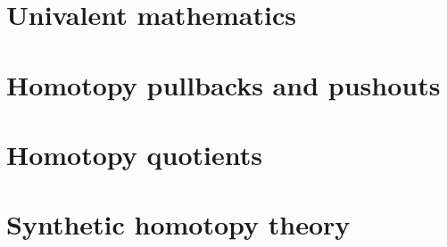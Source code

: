 \documentclass[10pt]{memoir} %
\begin{document}






\chapter{Univalent mathematics}\label{chap:univalent-mathematics}







\chapter{Homotopy pullbacks and pushouts}






\chapter{Homotopy quotients}


%





\chapter{Synthetic homotopy theory}




%


\backmatter

\printbibliography

\printindex
\end{document}

